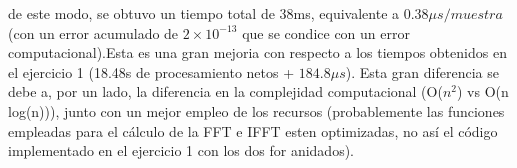 \noindent de este modo, se obtuvo un tiempo total de 38ms, equivalente a $0.38\mu s/muestra$ (con un error acumulado de $2\times 10^{-13}$ que se condice con un error computacional).Esta es una gran mejoria con respecto a los tiempos obtenidos en el ejercicio 1 (18.48s de procesamiento netos + $184.8\mu s$). Esta gran diferencia se debe a, por un lado, la diferencia en la complejidad computacional (O($n^2$) vs O(n log(n))), junto con un mejor empleo de los recursos (probablemente las funciones empleadas para el cálculo de la FFT e IFFT esten optimizadas, no así el código implementado en el ejercicio 1 con los dos for anidados).